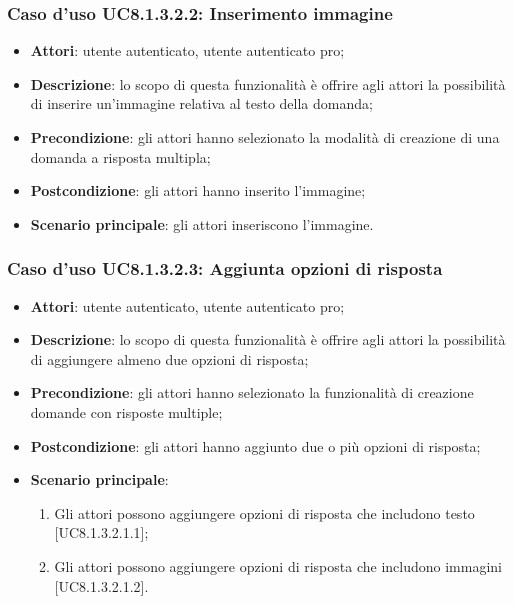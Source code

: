\subsubsection{Caso d'uso UC8.1.3.2.2: Inserimento immagine}
	\begin{itemize}
		\item
			\textbf{Attori}: utente autenticato, utente autenticato pro;
		\item		
			\textbf{Descrizione}: lo scopo di questa funzionalità è offrire agli attori la possibilità di inserire un'immagine relativa al testo della domanda;
		\item
			\textbf{Precondizione}: gli attori hanno selezionato la modalità di creazione di una domanda a risposta multipla; 
		\item
			\textbf{Postcondizione}: gli attori hanno inserito l'immagine;
		\item
			\textbf{Scenario principale}: gli attori inseriscono l'immagine. 	
	\end{itemize}
	
	
\subsubsection{Caso d'uso UC8.1.3.2.3: Aggiunta opzioni di risposta}
	\begin{itemize}
		\item
			\textbf{Attori}: utente autenticato, utente autenticato pro;
		\item		
			\textbf{Descrizione}: lo scopo di questa funzionalità è offrire agli attori la possibilità di aggiungere almeno due opzioni di risposta;
		\item
			\textbf{Precondizione}: gli attori hanno selezionato la funzionalità di creazione domande con risposte multiple; 
		\item
			\textbf{Postcondizione}: gli attori hanno aggiunto due o più opzioni di risposta;
		\item
			\textbf{Scenario principale}:
	       		\begin{enumerate}
	       			\item
	       			Gli attori possono aggiungere opzioni di risposta che includono testo [UC8.1.3.2.1.1];
					\item
					Gli attori possono aggiungere opzioni di risposta che includono immagini [UC8.1.3.2.1.2].
	 			\end{enumerate}
	\end{itemize}	
	
